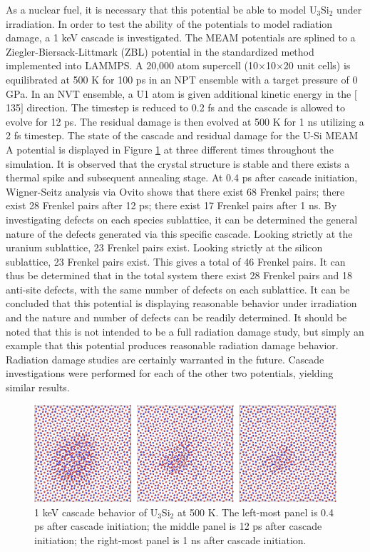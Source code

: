 \documentclass[review]{elsarticle}
\begin{document}
\FloatBarrier

As a nuclear fuel, it is necessary that this potential be able to model U$_{3}$Si$_{2}$ under irradiation.  In order to test the ability of the potentials to model radiation damage, a 1 keV cascade is investigated.   The MEAM potentials are splined to a Ziegler-Biersack-Littmark (ZBL) \cite{zbl} potential in the standardized method implemented into LAMMPS.  A 20,000 atom supercell (10$\times$10$\times$20 unit cells) is equilibrated at 500 K for 100 ps in an NPT ensemble with a target pressure of 0 GPa.  In an NVT ensemble, a U1 atom is given additional kinetic energy in the $[$135$]$ direction.  The timestep is reduced to 0.2 fs and the cascade is allowed to evolve for 12 ps.  The residual damage is then evolved at 500 K for 1 ns utilizing a 2 fs timestep.  The state of the cascade and residual damage for the U-Si MEAM A potential is displayed in Figure \ref{fig:ben6} at three different times throughout the simulation.  It is observed that the crystal structure is stable and there exists a thermal spike and subsequent annealing stage.  At 0.4 ps after cascade initiation, Wigner-Seitz analysis via Ovito \cite{ovito} shows that there exist 68 Frenkel pairs; there exist 28 Frenkel pairs after 12 ps; there exist 17 Frenkel pairs after 1 ns.  By investigating defects on each species sublattice, it can be determined the general nature of the defects generated via this specific cascade.  Looking strictly at the uranium sublattice, 23 Frenkel pairs exist.  Looking strictly at the silicon sublattice, 23 Frenkel pairs exist.  This gives a total of 46 Frenkel pairs.  It can thus be determined that in the total system there exist 28 Frenkel pairs and 18 anti-site defects, with the same number of defects on each sublattice.  It can be concluded that this potential is displaying reasonable behavior under irradiation and the nature and number of defects can be readily determined.  It should be noted that this is not intended to be a full radiation damage study, but simply an example that this potential produces reasonable radiation damage behavior.  Radiation damage studies are certainly warranted in the future.  Cascade investigations were performed for each of the other two potentials, yielding similar results.  

 \begin{figure}[bt]
	\centering
	\includegraphics[width=\textwidth]{cascade_total.png}
    \caption{1 keV cascade behavior of U$_{3}$Si$_{2}$ at 500 K.  The left-most panel is 0.4 ps after cascade initiation; the middle panel is 12 ps after cascade initiation; the right-most panel is 1 ns after cascade initiation.}\label{fig:ben6}
\end{figure}
\end{document}
